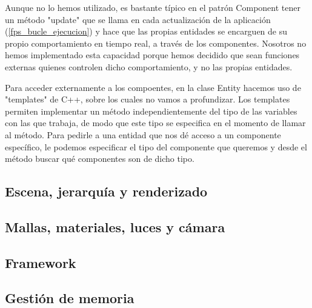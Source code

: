 Aunque no lo hemos utilizado, es bastante típico en el patrón Component tener un método "update" que se llama en cada actualización de la aplicación (\ref{fps_bucle_ejecucion}) y hace que las propias entidades se encarguen de su propio comportamiento en tiempo real, a través de los componentes. Nosotros no hemos implementado esta capacidad porque hemos decidido que sean funciones externas quienes controlen dicho comportamiento, y no las propias entidades.

Para acceder externamente a los compoentes, en la clase Entity hacemos uso de "templates" de C++, sobre los cuales no vamos a profundizar. Los templates permiten implementar un método independientemente del tipo de las variables con las que trabaja, de modo que este tipo se especifica en el momento de llamar al método. Para pedirle a una entidad que nos dé acceso a un componente específico, le podemos especificar el tipo del componente que queremos y desde el método buscar qué componentes son de dicho tipo.

\subsection{Escena, jerarquía y renderizado}
\label{scene_hierarchy}

\subsection{Mallas, materiales, luces y cámara}

\subsection{Framework}

\subsection{Gestión de memoria}